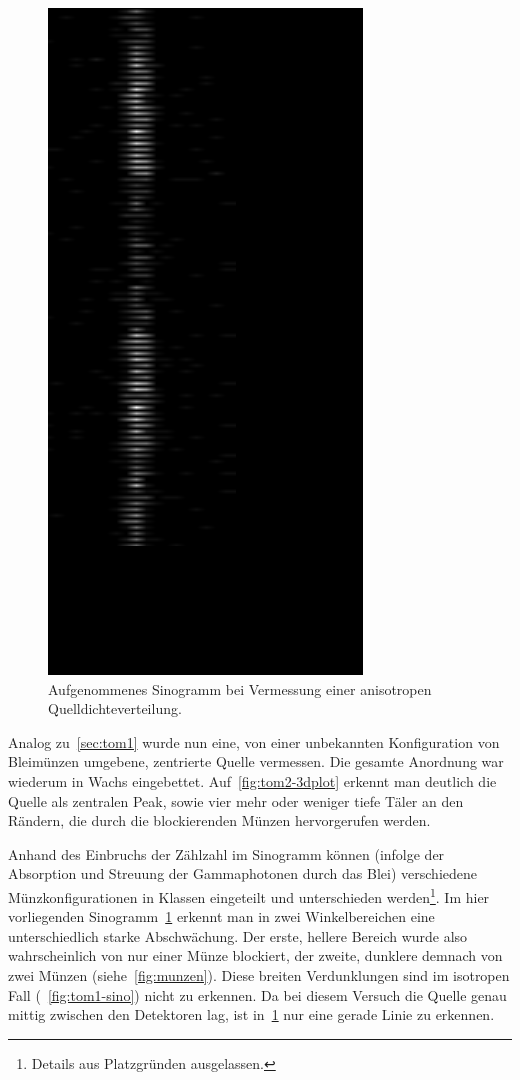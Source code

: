 \documentclass[slug=PET, room=Andreas-Schubert-Bau\,\ 424A, supervisor=Carsten\ Bittrich, coursedate=10.\ 01.\ 2020]{../../Lab_Report_LaTeX/lab_report}
\begin{document}
\begin{figure}[hb]
  \centering \includegraphics[width=.3\textwidth,
  angle=90]{../messungen/Tom2/tom2_Sinogramm.PNG}
  \caption{Aufgenommenes Sinogramm bei Vermessung einer anisotropen
    Quelldichteverteilung.}
  \label{fig:tom2}
\end{figure}

Analog zu~\ref{sec:tom1} wurde nun eine, von einer unbekannten
Konfiguration von Bleim\"unzen umgebene, zentrierte Quelle
vermessen. Die gesamte Anordnung war wiederum in Wachs eingebettet.
Auf~\ref{fig:tom2-3dplot} erkennt man deutlich die Quelle als
zentralen Peak, sowie vier mehr oder weniger tiefe T\"aler an den
R\"andern, die durch die blockierenden M\"unzen hervorgerufen werden.

Anhand des Einbruchs der Z\"ahlzahl im Sinogramm k\"onnen (infolge der
Absorption und Streuung der Gammaphotonen durch das Blei) verschiedene
M\"unzkonfigurationen in Klassen eingeteilt und unterschieden
werden\footnote{Details aus Platzgr\"unden ausgelassen.}. Im hier
vorliegenden Sinogramm~\ref{fig:tom2} erkennt man in zwei
Winkelbereichen eine unterschiedlich starke Abschw\"achung. Der erste,
hellere Bereich wurde also wahrscheinlich von nur einer M\"unze
blockiert, der zweite, dunklere demnach von zwei M\"unzen
(siehe~\ref{fig:munzen}). Diese breiten Verdunklungen sind im
isotropen Fall (~\ref{fig:tom1-sino}) nicht zu erkennen. Da bei diesem
Versuch die Quelle genau mittig zwischen den Detektoren lag, ist
in~\ref{fig:tom2} nur eine gerade Linie zu erkennen.
\end{document}
